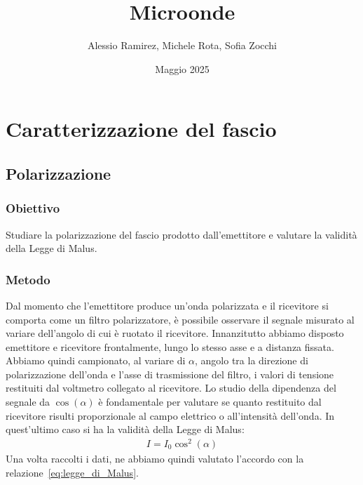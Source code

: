 \documentclass[a4paper]{article}
\title{Microonde}
\author{Alessio Ramirez, Michele Rota, Sofia Zocchi}
\date{Maggio 2025} %
\begin{document}
\maketitle
\section{Caratterizzazione del fascio}
\subsection{Polarizzazione}
\subsubsection{Obiettivo}
Studiare la polarizzazione del fascio prodotto dall'emettitore e valutare la validità della Legge di Malus.

\subsubsection{Metodo}
Dal momento che l'emettitore produce un'onda polarizzata e il ricevitore si comporta come un filtro polarizzatore, è possibile osservare il segnale misurato al variare dell'angolo di cui è ruotato il ricevitore. Innanzitutto abbiamo disposto emettitore e ricevitore frontalmente, lungo lo stesso asse e a distanza fissata. Abbiamo quindi campionato, al variare di $\alpha$, angolo tra la direzione di polarizzazione dell'onda e l'asse di trasmissione del filtro, i valori di tensione restituiti dal voltmetro collegato al ricevitore. Lo studio della dipendenza del segnale da $\cos(\alpha)$ è fondamentale per valutare se quanto restituito dal ricevitore risulti proporzionale al campo elettrico o all'intensità dell'onda. In quest'ultimo caso si ha la validità della Legge di Malus:
\begin{align}
I = I_0 \cos^2(\alpha)
\label{eq:legge_di_Malus}
\end{align}
Una volta raccolti i dati, ne abbiamo quindi valutato l'accordo con la relazione~\eqref{eq:legge_di_Malus}.
\end{document}
